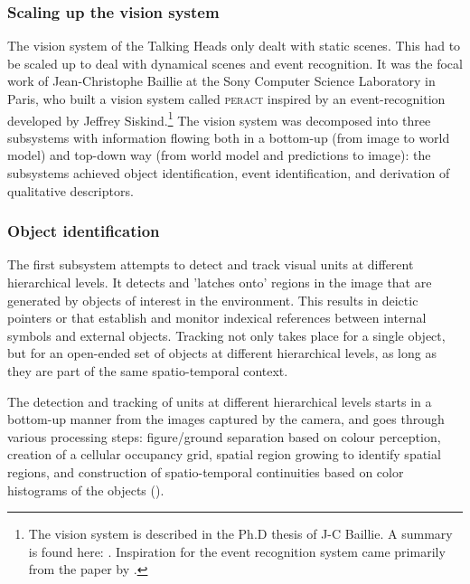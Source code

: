 \subsubsection{Scaling up the vision system}
The vision system of the Talking Heads only dealt with static scenes. This had to be scaled up to
deal with dynamical scenes and event recognition. It was the focal work of 
Jean-Christophe Baillie at the Sony Computer Science Laboratory in Paris, who built a vision system 
called \textsc{peract}  inspired by an event-recognition developed by Jeffrey 
Siskind.\footnote{The vision system is described in the Ph.D thesis of J-C Baillie. A summary is found here: 
\cite{Steels:2003}. Inspiration for the event recognition system came 
primarily from the paper by \cite{Siskind:2000}.}
The vision system was decomposed into three subsystems with information flowing both in a bottom-up
(from image to world model) and top-down way (from world model and predictions to image): the subsystems achieved 
object identification, event identification, and derivation of qualitative descriptors. 

\subsubsection{Object identification} The first subsystem attempts to detect and track visual units at different hierarchical levels. 
It detects and 'latches onto' regions in the image that are generated by objects of 
interest in the environment. This results in deictic pointers or  that establish and monitor indexical references 
between internal symbols and external objects. Tracking not only takes place for a single object, but for 
an open-ended set of objects at different hierarchical levels, as long as they are part of the same spatio-temporal context. 

The detection and tracking of units at different hierarchical levels starts in a bottom-up manner from the images captured by the camera, and goes through various processing steps: figure/ground separation based on colour perception, creation of a cellular occupancy grid, spatial region growing to identify spatial regions, and construction of spatio-temporal continuities based on 
color histograms of the objects (). 

